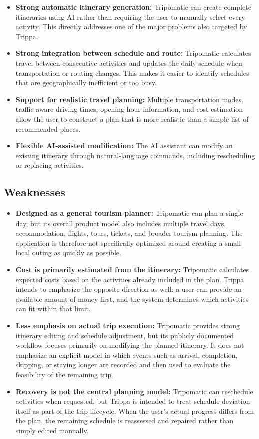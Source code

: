 \begin{itemize}
\item \textbf{Strong automatic itinerary generation:} Tripomatic can create complete itineraries using AI rather than requiring the user to manually select every activity. This directly addresses one of the major problems also targeted by Trippa.
\item \textbf{Strong integration between schedule and route:} Tripomatic calculates travel between consecutive activities and updates the daily schedule when transportation or routing changes. This makes it easier to identify schedules that are geographically inefficient or too busy.
\item \textbf{Support for realistic travel planning:} Multiple transportation modes, traffic-aware driving times, opening-hour information, and cost estimation allow the user to construct a plan that is more realistic than a simple list of recommended places.
\item \textbf{Flexible AI-assisted modification:} The AI assistant can modify an existing itinerary through natural-language commands, including rescheduling or replacing activities.
\end{itemize}


\subsection{Weaknesses}

\begin{itemize}
\item \textbf{Designed as a general tourism planner:} Tripomatic can plan a single day, but its overall product model also includes multiple travel days, accommodation, flights, tours, tickets, and broader tourism planning. The application is therefore not specifically optimized around creating a small local outing as quickly as possible.
\item \textbf{Cost is primarily estimated from the itinerary:} Tripomatic calculates expected costs based on the activities already included in the plan. Trippa intends to emphasize the opposite direction as well: a user can provide an available amount of money first, and the system determines which activities can fit within that limit.
\item \textbf{Less emphasis on actual trip execution:} Tripomatic provides strong itinerary editing and schedule adjustment, but its publicly documented workflow focuses primarily on modifying the planned itinerary. It does not emphasize an explicit model in which events such as arrival, completion, skipping, or staying longer are recorded and then used to evaluate the feasibility of the remaining trip.
\item \textbf{Recovery is not the central planning model:} Tripomatic can reschedule activities when requested, but Trippa is intended to treat schedule deviation itself as part of the trip lifecycle. When the user's actual progress differs from the plan, the remaining schedule is reassessed and repaired rather than simply edited manually.
\end{itemize}


